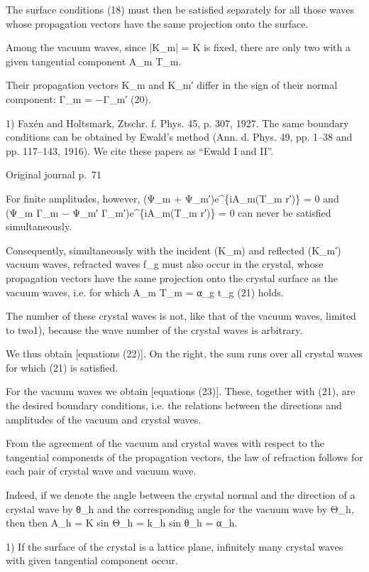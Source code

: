 \documentclass[10pt]{article}
\newcommand{\origpage}[1]{\par\medskip\noindent\hfill{\small\color{notegray}Original journal p.~#1}\hfill\mbox{}\par\smallskip}
\begin{document}
The surface conditions (18) must then be satisfied separately for all those waves whose propagation vectors have the same projection onto the surface.\par
Among the vacuum waves, since |K\_m| = K is fixed, there are only two with a given tangential component A\_m T\_m.\par
Their propagation vectors K\_m and K\_m′ differ in the sign of their normal component: Γ\_m = −Γ\_m′ (20).\par
\noindent\footnotesize 1) Faxén and Holtsmark, Ztschr. f. Phys. 45, p. 307, 1927. The same boundary conditions can be obtained by Ewald’s method (Ann. d. Phys. 49, pp. 1–38 and pp. 117–143, 1916). We cite these papers as “Ewald I and II”.\par\normalsize
\origpage{71}
For finite amplitudes, however, (Ψ\_m + Ψ\_m′)e\textasciicircum{}\{iA\_m(T\_m r′)\} = 0 and (Ψ\_m Γ\_m − Ψ\_m′ Γ\_m′)e\textasciicircum{}\{iA\_m(T\_m r′)\} = 0 can never be satisfied simultaneously.\par
Consequently, simultaneously with the incident (K\_m) and reflected (K\_m′) vacuum waves, refracted waves f\_g must also occur in the crystal, whose propagation vectors have the same projection onto the crystal surface as the vacuum waves, i.e. for which A\_m T\_m = α\_g t\_g (21) holds.\par
The number of these crystal waves is not, like that of the vacuum waves, limited to two1), because the wave number of the crystal waves is arbitrary.\par
We thus obtain [equations (22)]. On the right, the sum runs over all crystal waves for which (21) is satisfied.\par
For the vacuum waves we obtain [equations (23)]. These, together with (21), are the desired boundary conditions, i.e. the relations between the directions and amplitudes of the vacuum and crystal waves.\par
From the agreement of the vacuum and crystal waves with respect to the tangential components of the propagation vectors, the law of refraction follows for each pair of crystal wave and vacuum wave.\par
Indeed, if we denote the angle between the crystal normal and the direction of a crystal wave by θ\_h and the corresponding angle for the vacuum wave by Θ\_h, then then A\_h = K sin Θ\_h = k\_h sin θ\_h = α\_h.\par
\noindent\footnotesize 1) If the surface of the crystal is a lattice plane, infinitely many crystal waves with given tangential component occur.\par\normalsize
\end{document}
